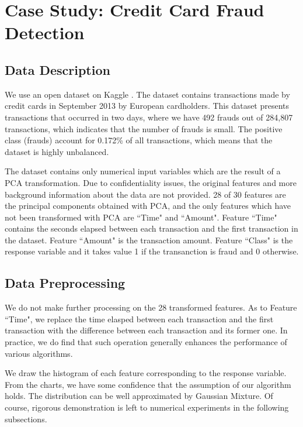 \documentclass[english]{article}
\begin{document}
\section{Case Study: Credit Card Fraud Detection}

\subsection{Data Description}
\par We use an open dataset on Kaggle \cite{dataset}. The dataset contains transactions made by credit cards in September 2013 by European cardholders. This dataset presents transactions that occurred in two days, where we have 492 frauds out of 284,807 transactions, which indicates that the number of frauds is small. The positive class (frauds) account for 0.172\% of all transactions, which means that the dataset is highly unbalanced.

The dataset contains only numerical input variables which are the result of a PCA transformation. Due to confidentiality issues, the original features and more background information about the data are not provided. 28 of 30 features are the principal components obtained with PCA, and the only features which have not been transformed with PCA are ``Time" and ``Amount". Feature ``Time" contains the seconds elapsed between each transaction and the first transaction in the dataset. Feature ``Amount" is the transaction amount. Feature ``Class" is the response variable and it takes value 1 if the transanction is fraud and 0 otherwise.

\subsection{Data Preprocessing}
\par We do not make further processing on the 28 transformed features. As to Feature ``Time", we replace the time elasped between each transaction and the first transaction with the difference between each transaction and its former one. In practice, we do find that such operation generally enhances the performance of various algorithms.

\par We draw the histogram of each feature corresponding to the response variable. From the charts, we have some confidence that the assumption of our algorithm holds. The distribution can be well approximated by Gaussian Mixture. Of course, rigorous demonstration is left to numerical experiments in the following subsections.
\end{document}
